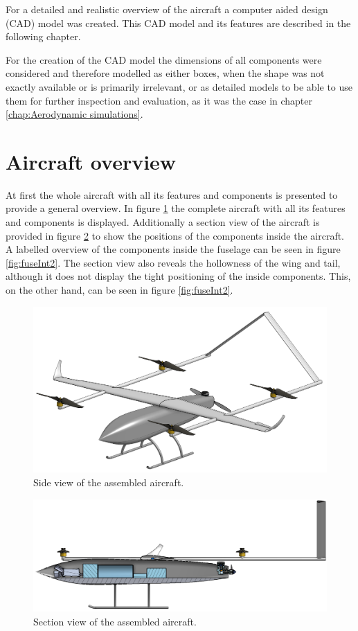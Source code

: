 \documentclass[english,fira]{ist-report}
\begin{document}
For a detailed and realistic overview of the aircraft a computer aided design (CAD) model was created. This CAD model and its features are described in the following chapter.

For the creation of the CAD model the dimensions of all components were considered and therefore modelled as either boxes, when the shape was not exactly available or is primarily irrelevant, or as detailed models to be able to use them for further inspection and evaluation, as it was the case in chapter \ref{chap:Aerodynamic simulations}.

\section{Aircraft overview}

At first the whole aircraft with all its features and components is presented to provide a general overview. In figure \ref{fig:aircraftFull} the complete aircraft with all its features and components is displayed. Additionally a section view of the aircraft is provided in figure \ref{fig:aircraftCut} to show the positions of the components inside the aircraft. A labelled overview of the components inside the fuselage can be seen in figure \ref{fig:fuseInt2}. The section view also reveals the hollowness of the wing and tail, although it does not display the tight positioning of the inside components. This, on the other hand, can be seen in figure \ref{fig:fuseInt2}.

\begin{figure}[ht]
	\centering
	\includegraphics[width = 1\linewidth]{graphics/cad/aircraftFull.png}
	\caption{Side view of the assembled aircraft.}
	\label{fig:aircraftFull}
\end{figure}

\begin{figure}[ht]
	\centering
	\includegraphics[width = 1\linewidth]{graphics/cad/aircraftCut.png}
	\caption{Section view of the assembled aircraft.}
	\label{fig:aircraftCut}
\end{figure}
\end{document}

